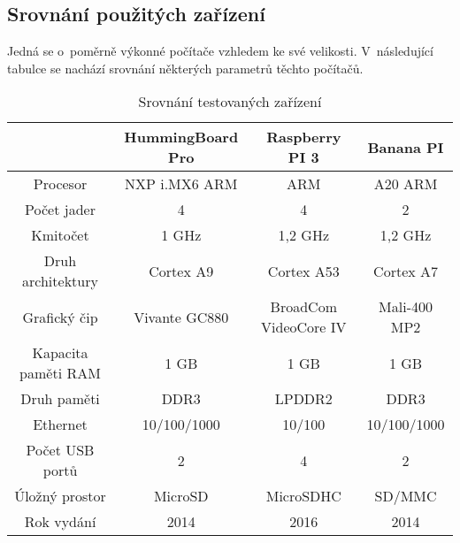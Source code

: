 \subsection{Srovnání použitých zařízení}
Jedná se o~poměrně výkonné počítače vzhledem ke své velikosti. V~následující tabulce se nachází srovnání některých parametrů těchto počítačů.
\begin{table}[H]
\centering
\caption{Srovnání testovaných zařízení}
\begin{tabular} { |c|c|c|c| }
\hline
{}                  & {HummingBoard Pro}    & {Raspberry PI 3}      & {Banana PI}          \\ \hline
Procesor            & NXP i.MX6 ARM         & ARM                   & A20 ARM              \\ \hline
Počet jader         & 4                     & 4                     & 2                    \\ \hline
Kmitočet            & 1 GHz                 & 1,2 GHz               & 1,2 GHz              \\ \hline
Druh architektury   & Cortex A9             & Cortex A53            & Cortex A7            \\ \hline
Grafický čip        & Vivante GC880         & BroadCom VideoCore IV & Mali-400 MP2         \\ \hline
Kapacita paměti RAM & 1 GB                  & 1 GB                  & 1 GB                 \\ \hline
Druh paměti         & DDR3                  & LPDDR2                & DDR3                 \\ \hline
Ethernet            & 10/100/1000           & 10/100                & 10/100/1000          \\ \hline
Počet USB portů     & 2                     & 4                     & 2                    \\ \hline
Úložný prostor      & MicroSD               & MicroSDHC             & SD/MMC               \\ \hline
Rok vydání          & 2014                  & 2016                  & 2014                 \\ \hline
\end{tabular}
\label{srovnaniPC}
\end{table}
